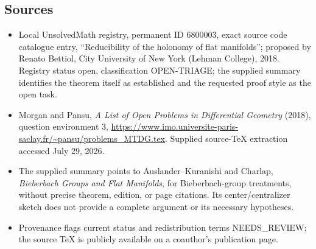 \documentclass[11pt]{article}
\begin{document}
\subsection{Sources}
\begin{itemize}
\item Local UnsolvedMath registry, permanent ID 6800003, exact source code catalogue entry, ``Reducibility of the holonomy of flat manifolds''; proposed by Renato Bettiol, City University of New York (Lehman College), 2018. Registry status open, classification OPEN-TRIAGE; the supplied summary identifies the theorem itself as established and the requested proof style as the open task.
\item Morgan and Pansu, \emph{A List of Open Problems in Differential Geometry} (2018), question environment 3, \url{https://www.imo.universite-paris-saclay.fr/~pansu/problems_MTDG.tex}. Supplied source-TeX extraction accessed July 29, 2026.
\item The supplied summary points to Auslander--Kuranishi and Charlap, \emph{Bieberbach Groups and Flat Manifolds}, for Bieberbach-group treatments, without precise theorem, edition, or page citations. Its center/centralizer sketch does not provide a complete argument or its necessary hypotheses.
\item Provenance flags current status and redistribution terms NEEDS\_REVIEW; the source TeX is publicly available on a coauthor's publication page.
\end{itemize}
\end{document}
